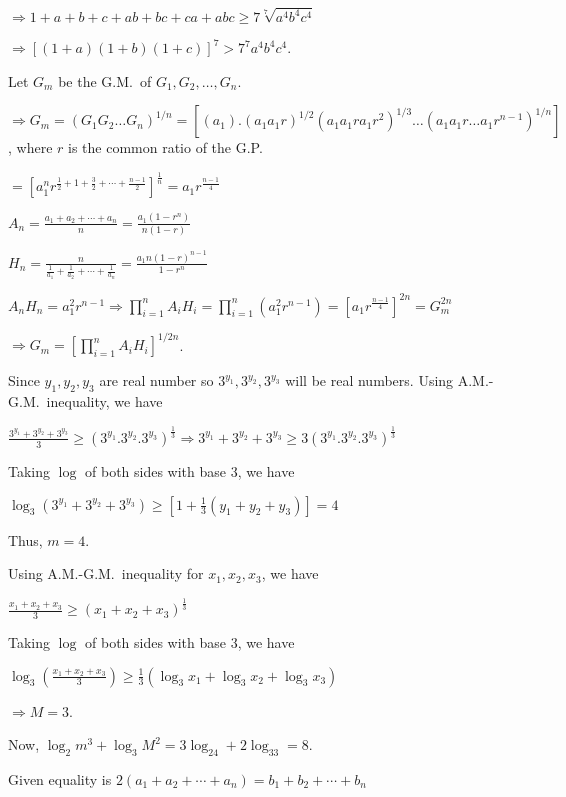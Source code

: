   $\Rightarrow 1 + a + b + c + ab + bc + ca + abc\geq 7\sqrt[7]{a^4b^4c^4}$

  $\Rightarrow \left[(1 + a)(1 + b)(1 + c)\right]^7 > 7^7a^4b^4c^4$.
\item Let $G_m$ be the G.M.\ of $G_1, G_2, \ldots, G_n$.

  $\Rightarrow G_m = \left(G_1G_2\ldots G_n\right)^{1/n} =
  \left[(a_1).(a_1a_1r)^{1/2}(a_1a_1ra_1r^2)^{1/3}\ldots (a_1a_1r\ldots a_1r^{n - 1})^{1/n}\right]$, where
  $r$ is the common ratio of the G.P.

  $= \left[a_1^nr^{\frac{1}{2} + 1 + \frac{3}{2} + \cdots + \frac{n - 1}{2}}\right]^{\frac{1}{n}} =
  a_1r^{\frac{n - 1}{4}}$

  $A_n = \frac{a_1 + a_2 + \cdots + a_n}{n} = \frac{a_1(1 - r^n)}{n(1 - r)}$

  $H_n = \frac{n}{\frac{1}{a_1} + \frac{1}{a_2} + \cdots + \frac{1}{a_n}} = \frac{a_1n(1 - r)^{n - 1}}{1 -
    r^n}$

  $A_nH_n = a_1^2r^{n - 1}\Rightarrow \displaystyle\prod_{i = 1}^nA_iH_i = \prod_{i = 1}^n(a_1^2r^{n - 1}) =
  \left[a_1r^{\frac{n - 1}{4}}\right]^{2n} = G_m^{2n}$

  $\Rightarrow G_m = \left[\displaystyle\prod_{i= 1}^nA_iH_i\right]^{1/2n}$.
\item Since $y_1, y_2, y_3$ are real number so $3^{y_1}, 3^{y_2}, 3^{y_3}$ will be real numbers. Using
  A.M.-G.M.\ inequality, we have

  $\frac{3^{y_1} + 3^{y_2} + 3^{y_3}}{3}\geq \left(3^{y_1}.3^{y_2}.3^{y_3}\right)^{\frac{1}{3}}\Rightarrow
  3^{y_1} + 3^{y_2} + 3^{y_3} \geq 3\left(3^{y_1}.3^{y_2}.3^{y_3}\right)^{\frac{1}{3}}$

  Taking $\log$ of both sides with base $3$, we have

  $\log_3\left(3^{y_1} + 3^{y_2} + 3^{y_3}\right)\geq \left[1 + \frac{1}{3}(y_1 + y_2 + y_3)\right] = 4$

  Thus, $m = 4$.

  Using A.M.-G.M.\ inequality for $x_1, x_2, x_3$, we have

  $\frac{x_1 + x_2 + x_3}{3}\geq \left(x_1 + x_2 + x_3\right)^{\frac{1}{3}}$

  Taking $\log$ of both sides with base $3$, we have

  $\log_3\left(\frac{x_1 + x_2 + x_3}{3}\right)\geq \frac{1}{3}\left(\log_3 x_1 + \log_3x_2 +
  \log_3x_3\right)$

  $\Rightarrow M = 3$.

  Now, $\log_2m^3 + \log_3M^2 = 3\log_24 + 2\log_33 = 8$.
\item Given equality is $2(a_1 + a_2 + \cdots + a_n) = b_1 + b_2 + \cdots + b_n$

